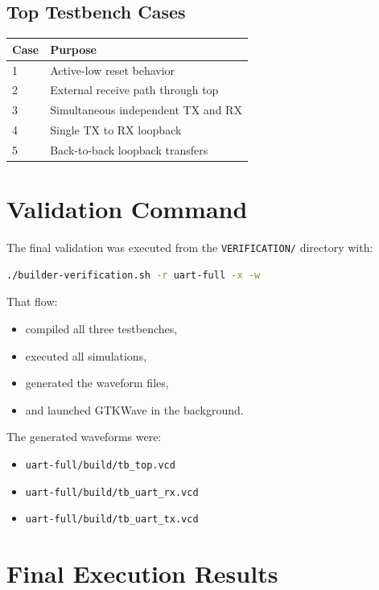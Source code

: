 \documentclass[12pt]{article}
\begin{document}
\subsection*{Top Testbench Cases}

\begin{center}
\begin{tabular}{@{}ll@{}}
\toprule
\textbf{Case} & \textbf{Purpose} \\
\midrule
1 & Active-low reset behavior \\
2 & External receive path through top \\
3 & Simultaneous independent TX and RX \\
4 & Single TX to RX loopback \\
5 & Back-to-back loopback transfers \\
\bottomrule
\end{tabular}
\end{center}

\section{Validation Command}

The final validation was executed from the \texttt{VERIFICATION/} directory with:

\begin{lstlisting}[language=bash]
./builder-verification.sh -r uart-full -x -w
\end{lstlisting}

That flow:

\begin{itemize}
    \item compiled all three testbenches,
    \item executed all simulations,
    \item generated the waveform files,
    \item and launched GTKWave in the background.
\end{itemize}

The generated waveforms were:

\begin{itemize}
    \item \texttt{uart-full/build/tb\_top.vcd}
    \item \texttt{uart-full/build/tb\_uart\_rx.vcd}
    \item \texttt{uart-full/build/tb\_uart\_tx.vcd}
\end{itemize}

\section{Final Execution Results}
\end{document}

